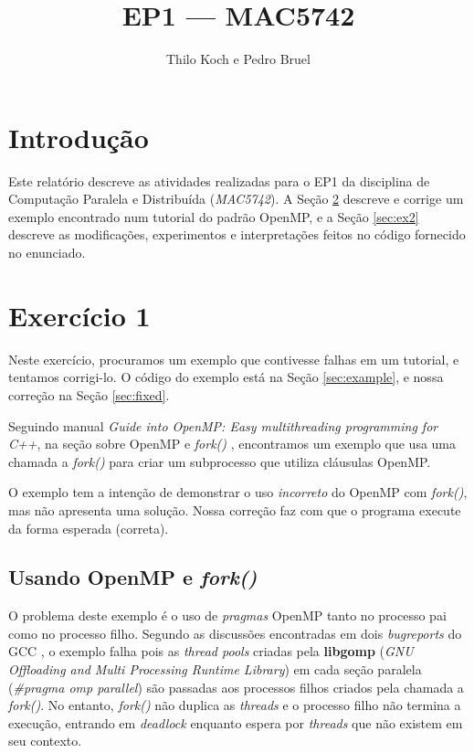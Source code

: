 \documentclass[a4paper, 12pt]{article}
\begin{document}
\hypersetup{backref,pdfpagemode=FullScreen,colorlinks=true}

\title{EP1 --- MAC5742}
\author{Thilo Koch e Pedro Bruel}
\date{}
\maketitle

\section{Introdução} \label{sec:intro}

Este relatório descreve as atividades realizadas
para o EP1 da disciplina de Computação Paralela e
Distribuída (\textit{MAC5742}). A Seção \ref{sec:ex1}
descreve e corrige um exemplo encontrado num tutorial do padrão
OpenMP, e a Seção \ref{sec:ex2} descreve as modificações,
experimentos e interpretações feitos no código fornecido no enunciado.

\section{Exercício 1} \label{sec:ex1}

Neste exercício, procuramos um exemplo que contivesse falhas em um
tutorial, e tentamos corrigi-lo. O código do exemplo está na Seção
\ref{sec:example}, e nossa correção na Seção \ref{sec:fixed}.

Seguindo manual \textit{Guide into OpenMP: Easy multithreading
programming for C++}, na seção sobre OpenMP e \textit{fork()}
\footnotemark[1],
encontramos um exemplo que usa uma chamada a \textit{fork()} para criar um
subprocesso que utiliza cláusulas OpenMP.

O exemplo tem a intenção de demonstrar o uso \textit{incorreto} do OpenMP
com \textit{fork()}, mas não apresenta uma solução.
Nossa correção faz com que o programa execute da forma esperada (correta).

\subsection{Usando OpenMP e \textit{fork()}}

O problema deste exemplo é o uso de \textit{pragmas} OpenMP tanto
no processo pai como no processo filho. Segundo as discussões
encontradas em dois \textit{bugreports} do GCC
\footnotemark[2]\footnotemark[3],
o exemplo falha pois as \textit{thread pools} criadas pela \textbf{libgomp}
(\textit{GNU Offloading and Multi Processing Runtime Library})
\footnotemark[4] em cada
seção paralela (\textit{\#pragma omp parallel}) são passadas aos processos
filhos criados pela chamada a \textit{fork()}. No entanto, \textit{fork()}
não duplica as \textit{threads} e o processo filho não termina a execução,
entrando em \textit{deadlock} enquanto espera por \textit{threads} que não
existem em seu contexto.
\end{document}
